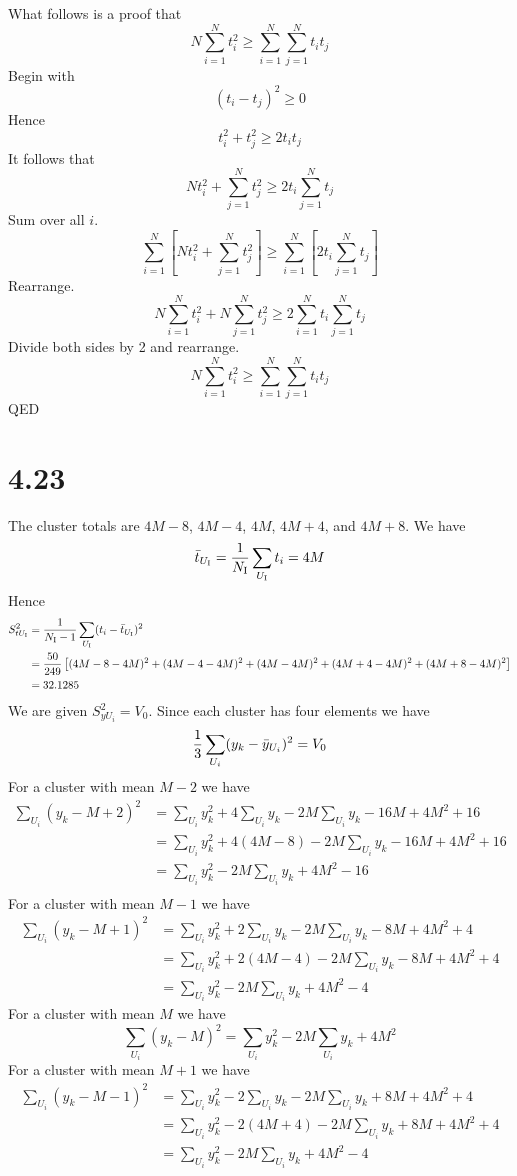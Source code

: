 \documentclass[12pt]{article}
\begin{document}

What follows is a proof that
\[
N\sum_{i=1}^Nt_i^2\ge\sum_{i=1}^N\sum_{j=1}^Nt_it_j
\]
Begin with
\[
(t_i-t_j)^2\ge 0
\]
Hence
\[
t_i^2+t_j^2\ge2t_it_j
\]
It follows that
\[
Nt_i^2+\sum_{j=1}^Nt_j^2\ge2t_i\sum_{j=1}^Nt_j
\]
Sum over all $i$.
\[
\sum_{i=1}^N\left[Nt_i^2+\sum_{j=1}^Nt_j^2\right]
\ge\sum_{i=1}^N\left[2t_i\sum_{j=1}^Nt_j\right]
\]
Rearrange.
\[
N\sum_{i=1}^Nt_i^2+N\sum_{j=1}^Nt_j^2
\ge2\sum_{i=1}^Nt_i\sum_{j=1}^Nt_j
\]
Divide both sides by 2 and rearrange.
\[
N\sum_{i=1}^Nt_i^2
\ge
\sum_{i=1}^N\sum_{j=1}^Nt_it_j
\]
QED


\section*{4.23}
The cluster totals are $4M-8$, $4M-4$, $4M$, $4M+4$, and $4M+8$.
We have
\[
\bar t_{U_{\rm I}}={1\over N_{\rm I}}\sum_{U_{\rm I}}t_i=4M
\]
Hence
\begin{align*}
S_{tU_{\rm I}}^2&={1\over N_{\rm I}-1}
\sum_{U_{\rm I}}(t_i-\bar t_{U_{\rm I}})^2\\
&=
{50\over249}\left[
(4M-8-4M)^2+(4M-4-4M)^2+(4M-4M)^2
+(4M+4-4M)^2+(4M+8-4M)^2\right]\\
&=32.1285
\end{align*}
We are given $S_{yU_i}^2=V_0$. Since each cluster has four elements we have
\[
{1\over3}\sum_{U_i}(y_k-\bar y_{U_i})^2=V_0
\]
For a cluster with mean $M-2$ we have
\begin{align*}
\sum_{U_i}(y_k-M+2)^2
&=
\sum_{U_i}y_k^2+4\sum_{U_i}y_k-2M\sum_{U_i}y_k-16M+4M^2+16\\
&=
\sum_{U_i}y_k^2+4(4M-8)-2M\sum_{U_i}y_k-16M+4M^2+16\\
&=
\sum_{U_i}y_k^2-2M\sum_{U_i}y_k+4M^2-16\\
\end{align*}
%
For a cluster with mean $M-1$ we have
\begin{align*}
\sum_{U_i}(y_k-M+1)^2
&=
\sum_{U_i}y_k^2+2\sum_{U_i}y_k-2M\sum_{U_i}y_k-8M+4M^2+4\\
&=
\sum_{U_i}y_k^2+2(4M-4)-2M\sum_{U_i}y_k-8M+4M^2+4\\
&=
\sum_{U_i}y_k^2-2M\sum_{U_i}y_k+4M^2-4
\end{align*}
%
For a cluster with mean $M$ we have
\[
\sum_{U_i}(y_k-M)^2=\sum_{U_i}y_k^2-2M\sum_{U_i} y_k+4M^2
\]
%
For a cluster with mean $M+1$ we have
\begin{align*}
\sum_{U_i}(y_k-M-1)^2
&=
\sum_{U_i}y_k^2-2\sum_{U_i}y_k-2M\sum_{U_i}y_k+8M+4M^2+4\\
&=
\sum_{U_i}y_k^2-2(4M+4)-2M\sum_{U_i}y_k+8M+4M^2+4\\
&=
\sum_{U_i}y_k^2-2M\sum_{U_i}y_k+4M^2-4
\end{align*}
\end{document}
